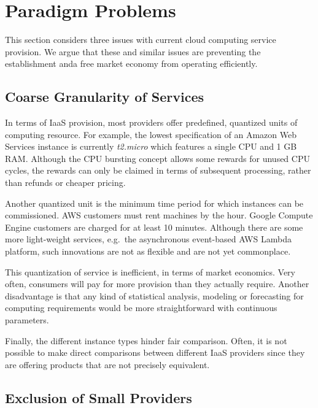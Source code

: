 \documentclass[conference,10pt]{IEEEtran}
\begin{document}

\section{Paradigm Problems}
\label{sec-probs}

This section considers three issues with current cloud computing service provision.
We argue that these and similar issues are preventing the establishment anda free market economy from operating efficiently.


\subsection{Coarse Granularity of Services}

In terms of IaaS provision, most providers offer predefined, quantized units of computing resource. For example, the lowest specification of an Amazon Web Services instance is currently \emph{t2.micro} which features a single CPU and 1 GB RAM. Although the CPU bursting concept allows some rewards for unused CPU cycles, the rewards can only be claimed in terms of subsequent processing, rather than refunds or cheaper pricing.  

Another quantized unit is the minimum time period for which instances can be commissioned. AWS customers must rent machines by the hour. Google Compute Engine customers are charged for at least 10 minutes.
Although there are some more light-weight services, e.g.\ the asynchronous event-based AWS Lambda platform, such innovations are not as flexible and are not yet commonplace.

This quantization of service is inefficient, in terms of market economics. Very often, consumers will pay for more provision than they actually require. Another disadvantage is that any kind of statistical analysis, modeling or forecasting for computing requirements would be more straightforward with continuous parameters. 

Finally, the different instance types hinder fair comparison. Often, it is not possible to make direct comparisons between different IaaS providers since they are offering products that are not precisely equivalent.


\subsection{Exclusion of Small Providers}
\end{document}

